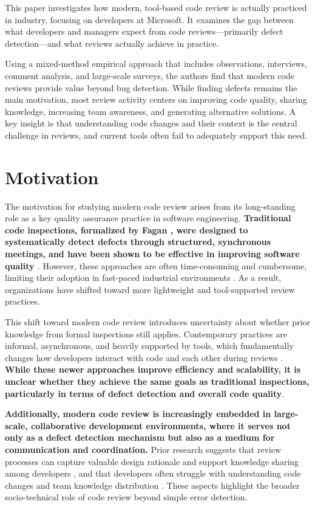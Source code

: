 This paper investigates how modern, tool-based code review is actually practiced in industry, focusing on developers at Microsoft. It examines the gap between what developers and managers expect from code reviews—primarily defect detection—and what reviews actually achieve in practice.

Using a mixed-method empirical approach that includes observations, interviews, comment analysis, and large-scale surveys, the authors find that modern code reviews provide value beyond bug detection. While finding defects remains the main motivation, most review activity centers on improving code quality, sharing knowledge, increasing team awareness, and generating alternative solutions. A key insight is that understanding code changes and their context is the central challenge in reviews, and current tools often fail to adequately support this need.

\section{Motivation}
The motivation for studying modern code review arises from its long-standing role as a key quality assurance practice in software engineering. \textbf{Traditional code inspections, formalized by Fagan \cite{fagan1976design}, were designed to systematically detect defects through structured, synchronous meetings, and have been shown to be effective in improving software quality \cite{ackerman1984software}}. However, these approaches are often time-consuming and cumbersome, limiting their adoption in fast-paced industrial environments \cite{shull2008inspecting}. As a result, organizations have shifted toward more lightweight and tool-supported review practices.

This shift toward modern code review introduces uncertainty about whether prior knowledge from formal inspections still applies. Contemporary practices are informal, asynchronous, and heavily supported by tools, which fundamentally changes how developers interact with code and each other during reviews \cite{rigby2012open}. \textbf{While these newer approaches improve efficiency and scalability, it is unclear whether they achieve the same goals as traditional inspections, particularly in terms of defect detection and overall code quality}.

\textbf{Additionally, modern code review is increasingly embedded in large-scale, collaborative development environments, where it serves not only as a defect detection mechanism but also as a medium for communication and coordination.} Prior research suggests that review processes can capture valuable design rationale and support knowledge sharing among developers \cite{sutherland2009can}, and that developers often struggle with understanding code changes and team knowledge distribution \cite{latoza2006maintaining}. These aspects highlight the broader socio-technical role of code review beyond simple error detection.

